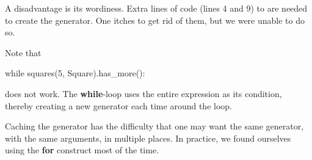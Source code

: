 \begin{itemize}
\smallv
A disadvantage is its wordiness. Extra lines of code (lines 4 and 9) to are needed to create the generator. One itches to get rid of them, but we were unable to do so. 

\smallv
Note that 
\begin{python}
    while squares(5, Square).has_more():
\end{python}

does not work. The \textbf{while}-loop uses the entire expression as its condition, thereby creating a new generator each time around the loop. 

\smallv
Caching the generator has the difficulty that one may want the same generator, with the same arguments, in multiple places. In practice, we found ourselves using the \textbf{for} construct most of the time.

\end{itemize}
